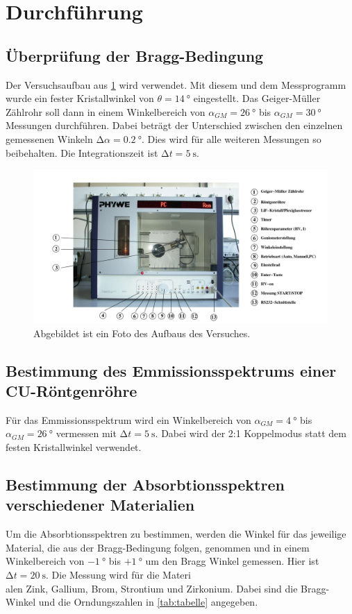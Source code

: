 \section{Durchführung}
\label{sec:Durchführung}

\subsection{Überprüfung der Bragg-Bedingung}
Der Versuchsaufbau aus \ref{fig:Aufbau} wird verwendet.
Mit diesem und dem Messprogramm wurde ein fester Kristallwinkel von $\theta = \qty{14}{\degree}$ eingestellt.
Das Geiger-Müller Zählrohr soll dann in einem Winkelbereich von $\alpha_{GM}=\qty{26}{\degree}$ bis $\alpha_{GM}=\qty{30}{\degree}$ Messungen durchführen.
Dabei beträgt der Unterschied zwischen den einzelnen gemessenen Winkeln $\increment \alpha = \qty{0.2}{\degree}$.
Dies wird für alle weiteren Messungen so beibehalten.
Die Integrationszeit ist $\increment t=\qty{5}{\second}$.

\begin{figure}[H]
    \centering
    \includegraphics[width=\textwidth]{Bilder/Aufbau.png}
    \caption{Abgebildet ist ein Foto des Aufbaus des Versuches.}
    \label{fig:Aufbau}
\end{figure}

\subsection{Bestimmung des Emmissionsspektrums einer CU-Röntgenröhre}
Für das Emmissionsspektrum wird ein Winkelbereich von $\alpha_{GM}=\qty{4}{\degree}$ bis $\alpha_{GM}=\qty{26}{\degree}$ vermessen mit $\increment t=\qty{5}{\second}$.
Dabei wird der 2:1 Koppelmodus statt dem festen Kristallwinkel verwendet.

\subsection{Bestimmung der Absorbtionsspektren verschiedener Materialien}
Um die Absorbtionsspektren zu bestimmen, werden die Winkel für das jeweilige Material, die aus der Bragg-Bedingung folgen, genommen und in einem Winkelbereich von 
$\qty{-1}{\degree}$ bis $+ \qty{1}{\degree}$ um den Bragg Winkel gemessen.
Hier ist $\increment t=\qty{20}{\second}$.
Die Messung wird für die Materi\\alen Zink, Gallium, Brom, Strontium und Zirkonium.
Dabei sind die Bragg-Winkel und die Orndungszahlen in \ref{tab:tabelle} angegeben.

